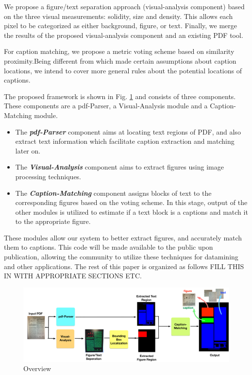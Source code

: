 \documentclass{article}
\begin{document}
We propose a figure/text separation approach (visual-analysis component) based on the three visual measurements: solidity, size and density. This allows each pixel to be categorized as either background, figure, or text. Finally, we merge the results of the proposed visual-analysis component and an existing PDF tool.

For caption matching, we propose a metric voting scheme based on similarity proximity.Being different from \cite{clark2016pdffigures} which made certain assumptions about caption locations, we intend to cover more general rules about the potential locations of captions. 

The proposed framework is shown in Fig. \ref{fig:framework} and consists of three components. These components are a pdf-Parser, a Visual-Analysis module and a Caption-Matching module. 
\begin{itemize}
	\item[(1)] The \textbf{\textit{pdf-Parser}} component aims at locating text regions of PDF, and also extract text information which  facilitate caption extraction and matching later on. 
	\item[(2)]The \textbf{\textit{Visual-Analysis}} component aims to extract figures using image processing techniques. 
	\item[(3)]The \textbf{\textit{Caption-Matching}} component assigns blocks of text to the corresponding figures based on the voting scheme. In this stage, output of the other modules is utilized to estimate if a text block is a captions and match it to the appropriate figure. 
\end{itemize}

These modules allow our system to better extract figures, and accurately match them to captions. This code will be made available to the public upon publication, allowing the community to utilize these techniques for datamining and other applications. The rest of this paper is organized as follows FILL THIS IN WITH APPROPRIATE SECTIONS ETC.

\begin{figure}[tb] %
\centering
\includegraphics[width=150mm]{Framework} 
\caption{
Overview}
\label{fig:framework}
\end{figure}
\end{document}
